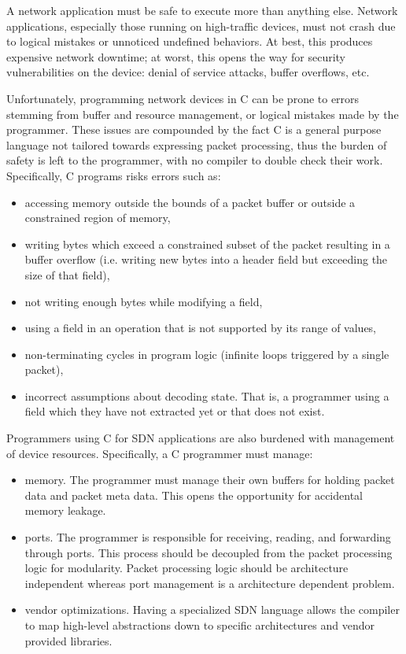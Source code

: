 A network application must be safe to execute more than anything else.
Network applications, especially those running on high-traffic devices, must not
crash due to logical mistakes or unnoticed undefined behaviors.
At best, this produces expensive network downtime; at worst, this
opens the way for security vulnerabilities on the device:
denial of service attacks, buffer overflows, etc.

Unfortunately, programming network devices in C can be prone
to errors stemming from buffer and resource management, or logical mistakes made by the programmer.
These issues are compounded by the fact C is a general
purpose language not tailored towards expressing packet processing, thus the burden of
safety
is left to the programmer, with no compiler to double check their work.
Specifically, C programs risks errors such as:

\begin{itemize}
\item accessing memory outside the bounds of a packet buffer or outside a
constrained
region of memory,

\item writing bytes which exceed a constrained subset of the packet
resulting in a buffer overflow (i.e. writing new bytes into a header field
but exceeding the size of that field),

\item not writing enough bytes while modifying a field,

\item using a field in an operation that is not supported by its
range of values,

\item non-terminating cycles in program logic (infinite loops
triggered by a single packet),

\item incorrect assumptions about decoding state. That is, a programmer using
a field which they have not extracted yet or that does not exist.
\end{itemize}

Programmers using C for SDN applications are also burdened with management of
device resources. Specifically, a C programmer must manage:

\begin{itemize}
\item memory. The programmer must manage their own buffers for holding packet
data and packet meta data. This opens the opportunity for accidental
memory leakage.

\item ports. The programmer is responsible for receiving, reading, and
forwarding
through ports. This process should be decoupled from the packet processing logic
for modularity. Packet processing logic should be architecture
independent
whereas port management is a architecture dependent problem.

\item vendor optimizations. Having a specialized SDN language allows the compiler to map high-level abstractions down to specific architectures and vendor provided libraries.
\end{itemize}

